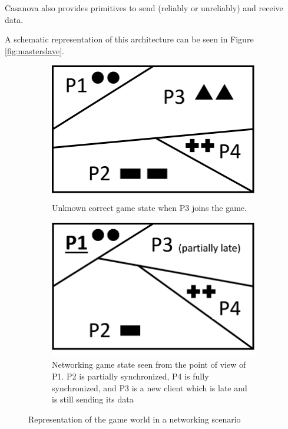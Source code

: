 Casanova also provides primitives to send (reliably or unreliably) and receive data.

A schematic representation of this architecture can be seen in Figure \ref{fig:masterslave}.

\begin{figure}
	\begin{subfigure}{0.5\textwidth}
		\centering
		\includegraphics[scale=0.4]{Figures/networking2}
		\caption{Unknown correct game state when P3 joins the game.}
		\label{subfig:networking_ideal}
	\end{subfigure}
	\begin{subfigure}{0.5\textwidth}
		\centering
		\includegraphics[scale=0.4]{Figures/networking1}
		\caption{Networking game state seen from the point of view of P1. P2 is partially synchronized, P4 is fully synchronized, and P3 is a new client which is late and is still sending its data}
		\label{subfig:networking_relative}
	\end{subfigure}
	\caption{Representation of the game world in a networking scenario}
	\label{fig:network_world}
\end{figure}

